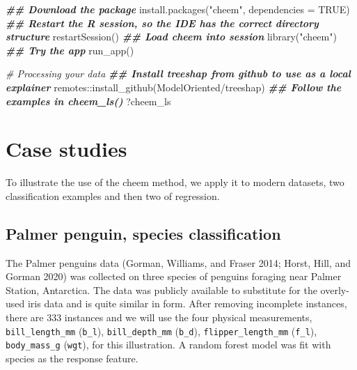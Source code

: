 \documentclass[
]{article}
\newenvironment{Shaded}{\begin{snugshade}}{\end{snugshade}}
\newcommand{\AttributeTok}[1]{\textcolor[rgb]{0.77,0.63,0.00}{#1}}
\newcommand{\CommentTok}[1]{\textcolor[rgb]{0.56,0.35,0.01}{\textit{#1}}}
\newcommand{\ConstantTok}[1]{\textcolor[rgb]{0.00,0.00,0.00}{#1}}
\newcommand{\DocumentationTok}[1]{\textcolor[rgb]{0.56,0.35,0.01}{\textbf{\textit{#1}}}}
\newcommand{\FunctionTok}[1]{\textcolor[rgb]{0.00,0.00,0.00}{#1}}
\newcommand{\NormalTok}[1]{#1}
\newcommand{\SpecialCharTok}[1]{\textcolor[rgb]{0.00,0.00,0.00}{#1}}
\newcommand{\StringTok}[1]{\textcolor[rgb]{0.31,0.60,0.02}{#1}}
\begin{document}
\begin{Shaded}
\begin{Highlighting}[]
\DocumentationTok{\#\# Download the package}
\FunctionTok{install.packages}\NormalTok{(}\StringTok{"cheem"}\NormalTok{, }\AttributeTok{dependencies =} \ConstantTok{TRUE}\NormalTok{)}
\DocumentationTok{\#\# Restart the R session, so the IDE has the correct directory structure}
\FunctionTok{restartSession}\NormalTok{()}
\DocumentationTok{\#\# Load cheem into session}
\FunctionTok{library}\NormalTok{(}\StringTok{"cheem"}\NormalTok{)}
\DocumentationTok{\#\# Try the app}
\FunctionTok{run\_app}\NormalTok{()}

\CommentTok{\# Processing your data}
\DocumentationTok{\#\# Install treeshap from github to use as a local explainer}
\NormalTok{remotes}\SpecialCharTok{::}\FunctionTok{install\_github}\NormalTok{(}\StringTok{\textquotesingle{}ModelOriented/treeshap\textquotesingle{}}\NormalTok{)}
\DocumentationTok{\#\# Follow the examples in cheem\_ls()}
\NormalTok{?cheem\_ls}
\end{Highlighting}
\end{Shaded}

\hypertarget{sec:casestudies}{%
\section{Case studies}\label{sec:casestudies}}

To illustrate the use of the cheem method, we apply it to modern datasets, two classification examples and then two of regression.

\hypertarget{palmer-penguin-species-classification}{%
\subsection{Palmer penguin, species classification}\label{palmer-penguin-species-classification}}

The Palmer penguins data (Gorman, Williams, and Fraser 2014; Horst, Hill, and Gorman 2020) was collected on three species of penguins foraging near Palmer Station, Antarctica. The data was publicly available to substitute for the overly-used iris data and is quite similar in form. After removing incomplete instances, there are 333 instances and we will use the four physical measurements, \texttt{bill\_length\_mm} (\texttt{b\_l}), \texttt{bill\_depth\_mm} (\texttt{b\_d}), \texttt{flipper\_length\_mm} (\texttt{f\_l}), \texttt{body\_mass\_g} (\texttt{wgt}), for this illustration. A random forest model was fit with species as the response feature.
\end{document}
